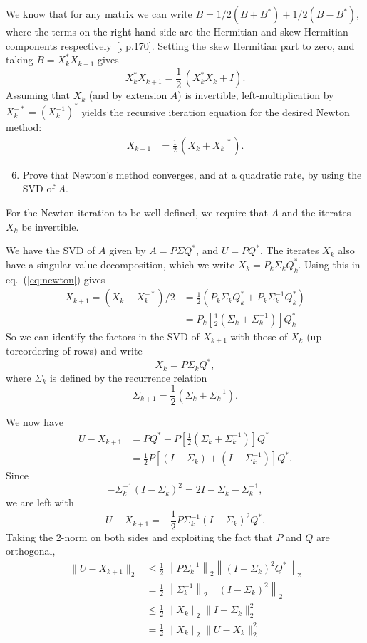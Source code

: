 \documentclass[10pt, A4paper]{article}
\begin{document}
We know that for any matrix we can write $B = 1/2(B + B^*) + 
1/2(B-B^*)$, where the terms on the right-hand side are the Hermitian 
and skew Hermitian components respectively~[\citealp{hojo1985}, p.170].
Setting the skew Hermitian part to zero, and taking $B = X_k^*X_{k+1}$ 
gives
$$ X_k^*X_{k+1} = \frac{1}{2} \, (X_k^*X_k + I).$$
Assuming that $X_k$ (and by extension $A$) is invertible, 
left-multiplication by $X_k^{-*} = (X_k^{-1})^*$ yields the recursive 
iteration equation for the desired Newton method:
\begin{align}
	X_{k+1} &= \frac{1}{2} \, (X_k + X_k^{-*}).
	\label{eq:newton}
\end{align}





\vspace{0.2cm}
\begin{enumerate}
	\setcounter{enumi}{5}
	\item Prove that Newton's method converges, and at a quadratic
	rate, by using the SVD of $A$.
\end{enumerate}

For the Newton iteration to be well defined, we require that $A$ and 
the iterates $X_k$ be invertible.

We have the SVD of $A$ given by $A = P\Sigma Q^*$, and $U = PQ^*$.
The iterates $X_k$ also have a singular value decomposition, which we 
write $X_k=P_k \Sigma_k Q_k^*$. Using this in eq.~(\ref{eq:newton}) 
gives
\begin{align*}
	X_{k+1} = (X_k + X_k^{-*})/2 &= \frac{1}{2} (P_k \Sigma_k Q_k^* + 
	P_k \Sigma_k^{-1} Q_k^*)\\
	&= P_k \left[\frac{1}{2}(\Sigma_k + \Sigma_k^{-1})\right] Q_k^*
\end{align*}
So we can identify the factors in the SVD of $X_{k+1}$ with those of 
$X_k$ (up toreordering of rows) and write 
$$X_k = P \Sigma_k Q^*,$$
where $\Sigma_k$ is defined by the recurrence relation
$$
	\Sigma_{k+1} = \frac{1}{2} \left(\Sigma_k + \Sigma_k^{-1} \right).
$$

We now have
\begin{align*}
	U - X_{k+1} &= PQ^* - P\left[\frac{1}{2}
	\left(\Sigma_k + \Sigma_k^{-1}\right)\right] Q^* \\
	&= \frac{1}{2} P \left[\left(I - \Sigma_k\right) + 
	\left(I - \Sigma_k^{-1}\right) \right] Q^*.
\end{align*}
Since
$$
	- \Sigma_k^{-1} (I - \Sigma_k)^2 = 2I -\Sigma_k - \Sigma_k^{-1},
$$
we are left with $$U - X_{k+1} = -\frac{1}{2} P \Sigma_k^{-1} 
\left( I - \Sigma_k \right)^2 Q^*.$$
Taking the 2-norm on both sides and exploiting the fact that $P$ and 
$Q$ are orthogonal,
\begin{align*}
	\| U - X_{k+1} \|_2 &\leq \frac{1}{2}\, \left\| P\Sigma_k^{-1} 
	\right\|_2 \left\| (I - \Sigma_k)^2 Q^*\right\|_2 \\
	&= \frac{1}{2}\, \left\|\Sigma_k^{-1}\right\|_2 \left\| \left( I - 
	\Sigma_k \right)^2 \right\|_2 \\
	&\leq \frac{1}{2}\, \|X_k\|_2 \|I - \Sigma_k\|_2^2 \\
	&= \frac{1}{2}\, \|X_k\|_2 \|U - X_k\|_2^2
\end{align*}
\end{document}
